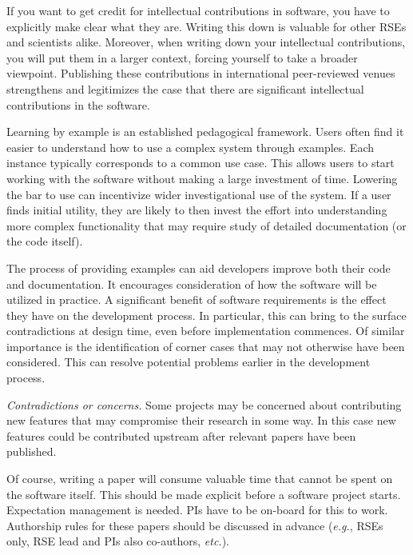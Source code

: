 \documentclass[a4paper,UKenglish]{dagman}
\newcommand{\eg}{\emph{e.g.},\xspace}
\newcommand{\etc}{\emph{etc.}\xspace}
\begin{document}
If you want to get credit for intellectual contributions in software, you have to explicitly make clear what they are. Writing this down is valuable for other RSEs and scientists alike. Moreover, when writing down your intellectual contributions, you will put them in a larger context, forcing yourself to take a broader viewpoint. Publishing these contributions in international peer-reviewed venues strengthens and legitimizes the case that there are significant intellectual contributions in the software.


Learning by example is an established pedagogical framework. Users often find it easier to understand how to use a complex system through examples. Each instance typically corresponds to a common use case. This allows users to start working with the software without making a large investment of time. Lowering the bar to use can incentivize wider investigational use of the system. If a user finds initial utility, they are likely to then invest the effort into understanding more complex functionality that may require study of detailed documentation (or the code itself).

The process of providing examples can aid developers improve both their code and documentation. It encourages consideration of how the software will be utilized in practice. A significant benefit of software requirements is the effect they have on the development process. In particular, this can bring to the surface contradictions at design time, even before implementation commences. Of similar importance is the identification of corner cases that may not otherwise have been considered. This can resolve potential problems earlier in the development process.

\emph{Contradictions or concerns.}
Some projects may be concerned about contributing new features that may compromise their research in some way. In this case new features could be contributed upstream after relevant papers have been published.

Of course, writing a paper will consume valuable time that cannot be spent on the software itself. This should be made explicit before a software project starts. Expectation management is needed. PIs have to be on-board for this to work. Authorship rules for these papers should be discussed in advance (\eg RSEs only, RSE lead and PIs also co-authors, \etc).
\end{document}
